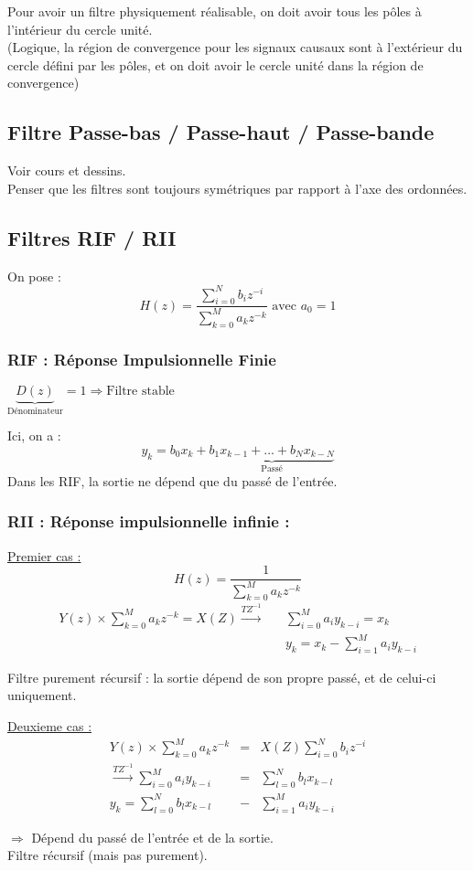Pour avoir un filtre physiquement réalisable, on doit avoir tous les pôles à l'intérieur du cercle unité. \\
(Logique, la région de convergence pour les signaux causaux sont à l'extérieur du cercle défini par les pôles, et on doit avoir le cercle unité dans la région de convergence)

\subsection{Filtre Passe-bas / Passe-haut / Passe-bande}

\noindent Voir cours et dessins. \\
Penser que les filtres sont toujours symétriques par rapport à l'axe des ordonnées. 

\subsection{Filtres RIF / RII}
On pose : \[H(z)=\frac{\sum_{i=0}^N b_i z^{-i}}{\sum_{k=0}^M a_k z^{-k}} \text{ avec } a_0=1\]
\subsubsection{RIF : Réponse Impulsionnelle Finie}
$\underbrace{D(z)}_{\text{Dénominateur}}=1 \Rightarrow \text{Filtre stable}$

Ici, on a : \[y_k = b_0 x_k + \underbrace{b_1 x_{k-1} + ... + b_N x_{k-N}}_{\text{Passé}}\]
Dans les RIF, la sortie ne dépend que du passé de l'entrée.

\subsubsection{RII : Réponse impulsionnelle infinie :}
\ul{Premier cas :}\[H(z)=\frac{1}{\sum_{k=0}^M a_k z^{-k}}\]
\begin{eqnarray*}
Y(z)\times \sum_{k=0}^M a_k z^{-k} = X(Z) \xrightarrow{TZ^{-1}}& & \sum_{i=0}^M a_i y_{k-i}=x_k \\
& & y_k = x_k - \sum_{i=1}^M a_i y_{k-i}
\end{eqnarray*}

Filtre purement récursif : la sortie dépend de son propre passé, et de celui-ci uniquement.

\ul{Deuxieme cas :}
\begin{eqnarray*} 
Y(z)\times \sum_{k=0}^M a_k z^{-k} &=& X(Z) \sum_{i=0}^N b_i z^{-i} \\
\xrightarrow{TZ^{-1}} \sum_{i=0}^M a_i y_{k-i} &=& \sum_{l=0}^N b_l x_{k-l} \\
y_k = \sum_{l=0}^N b_l x_{k-l} &-& \sum_{i=1}^M a_i y_{k-i}
\end{eqnarray*}

\noindent $\Rightarrow$ Dépend du passé de l'entrée et de la sortie. \\
Filtre récursif (mais pas purement).
